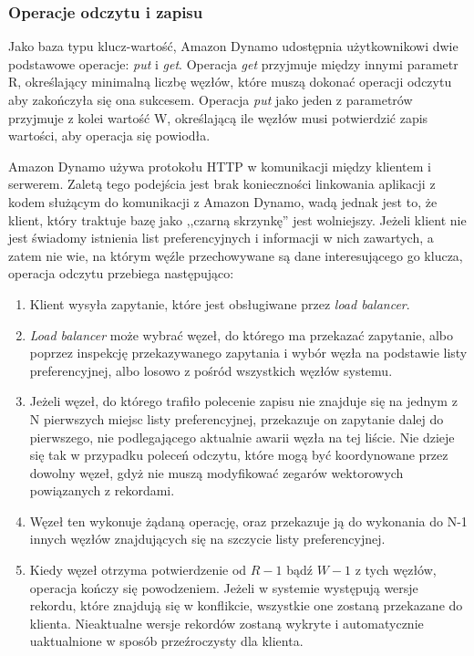 \subsubsection*{Operacje odczytu i zapisu}

Jako baza typu klucz-wartość, Amazon Dynamo udostępnia użytkownikowi dwie podstawowe operacje: \emph{put} i \emph{get}.
Operacja \emph{get} przyjmuje między innymi parametr R, określający minimalną liczbę węzłów, które muszą dokonać operacji odczytu aby zakończyła się ona sukcesem.
Operacja \emph{put} jako jeden z parametrów przyjmuje z kolei wartość W, określającą ile węzłów musi potwierdzić zapis wartości, aby operacja się powiodła.

Amazon Dynamo używa protokołu HTTP w komunikacji między klientem i serwerem.
Zaletą tego podejścia jest brak konieczności linkowania aplikacji z kodem służącym do komunikacji z Amazon Dynamo, wadą jednak jest to, że klient, który traktuje bazę jako ,,czarną skrzynkę'' jest wolniejszy.
Jeżeli klient nie jest świadomy istnienia list preferencyjnych i informacji w nich zawartych, a zatem nie wie, na którym węźle przechowywane są dane interesującego go klucza, operacja odczytu przebiega następująco: 
\begin{enumerate}
 \item Klient wysyła zapytanie, które jest obsługiwane przez \emph{load balancer}.
 \item \emph{Load balancer} może wybrać węzeł, do którego ma przekazać zapytanie, albo poprzez inspekcję przekazywanego zapytania i wybór węzła na podstawie listy preferencyjnej, albo losowo z pośród wszystkich węzłów systemu.
 \item Jeżeli węzeł, do którego trafiło polecenie zapisu nie znajduje się na jednym z N pierwszych miejsc listy preferencyjnej, przekazuje on zapytanie dalej do pierwszego, nie podlegającego aktualnie awarii węzła na tej liście.
 Nie dzieje się tak w przypadku poleceń odczytu, które mogą być koordynowane przez dowolny węzeł, gdyż nie muszą modyfikować zegarów wektorowych powiązanych z rekordami.
 \item Węzeł ten wykonuje żądaną operację, oraz przekazuje ją do wykonania do N-1 innych węzłów znajdujących się na szczycie listy preferencyjnej.
 \item Kiedy węzeł otrzyma potwierdzenie od $R-1$ bądź $W-1$ z tych węzłów, operacja kończy się powodzeniem.
 Jeżeli w systemie występują wersje rekordu, które znajdują się w konflikcie, wszystkie one zostaną przekazane do klienta.
 Nieaktualne wersje rekordów zostaną wykryte i automatycznie uaktualnione w sposób przeźroczysty dla klienta.
\end{enumerate}

